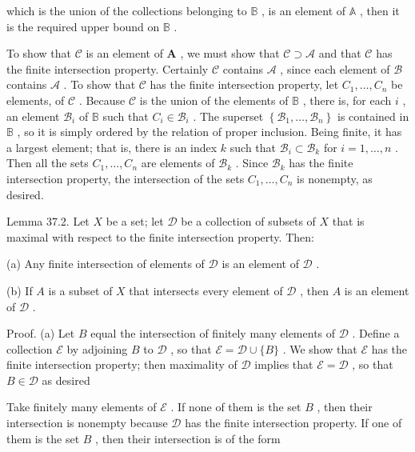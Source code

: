 which is the union of the collections belonging to \(\mathbb{B}\) , is an element of \(\mathbb{A}\) , then it is the required upper bound on \(\mathbb{B}\) .

To show that \(\mathcal{C}\) is an element of \(\mathbf{A}\) , we must show that \(\mathcal{C} \supset  \mathcal{A}\) and that \(\mathcal{C}\) has the finite intersection property. Certainly \(\mathcal{C}\) contains \(\mathcal{A}\) , since each element of \(\mathcal{B}\) contains \(\mathcal{A}\) . To show that \(\mathcal{C}\) has the finite intersection property, let \({C}_{1},\ldots ,{C}_{n}\) be elements, of \(\mathcal{C}\) . Because \(\mathcal{C}\) is the union of the elements of \(\mathbb{B}\) , there is, for each \(i\) , an element \({\mathcal{B}}_{i}\) of \(\mathbb{B}\) such that \({C}_{i} \in  {\mathcal{B}}_{i}\) . The superset \(\left\{  {{\mathcal{B}}_{1},\ldots ,{\mathcal{B}}_{n}}\right\}\) is contained in \(\mathbb{B}\) , so it is simply ordered by the relation of proper inclusion. Being finite, it has a largest element; that is, there is an index \(k\) such that \({\mathcal{B}}_{i} \subset  {\mathcal{B}}_{k}\) for \(i = 1,\ldots ,n\) . Then all the sets \({C}_{1},\ldots ,{C}_{n}\) are elements of \({\mathcal{B}}_{k}\) . Since \({\mathcal{B}}_{k}\) has the finite intersection property, the intersection of the sets \({C}_{1},\ldots ,{C}_{n}\) is nonempty, as desired.

Lemma 37.2. Let \(X\) be a set; let \(\mathcal{D}\) be a collection of subsets of \(X\) that is maximal with respect to the finite intersection property. Then:

(a) Any finite intersection of elements of \(\mathcal{D}\) is an element of \(\mathcal{D}\) .

(b) If \(A\) is a subset of \(X\) that intersects every element of \(\mathcal{D}\) , then \(A\) is an element of \(\mathcal{D}\) .

Proof. (a) Let \(B\) equal the intersection of finitely many elements of \(\mathcal{D}\) . Define a collection \(\mathcal{E}\) by adjoining \(B\) to \(\mathcal{D}\) , so that \(\mathcal{E} = \mathcal{D} \cup  \{ B\}\) . We show that \(\mathcal{E}\) has the finite intersection property; then maximality of \(\mathcal{D}\) implies that \(\mathcal{E} = \mathcal{D}\) , so that \(B \in  \mathcal{D}\) as desired

Take finitely many elements of \(\mathcal{E}\) . If none of them is the set \(B\) , then their intersection is nonempty because \(\mathcal{D}\) has the finite intersection property. If one of them is the set \(B\) , then their intersection is of the form

